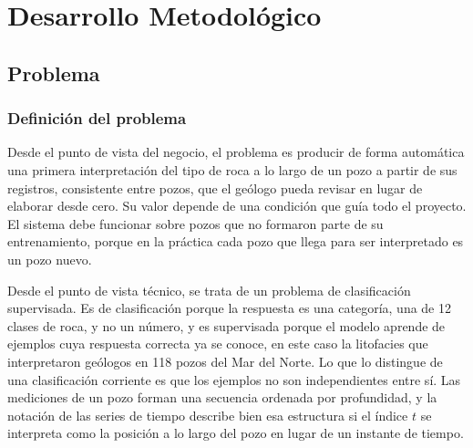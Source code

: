 \documentclass[11pt,a4paper]{article}
\begin{document}
\section{Desarrollo Metodológico}

\subsection{Problema}

\subsubsection{Definición del problema}
\label{sec:definicion-problema}

Desde el punto de vista del negocio, el problema es producir de forma automática una primera interpretación del tipo de roca a lo largo de un pozo a partir de sus registros, consistente entre pozos, que el geólogo pueda revisar en lugar de elaborar desde cero. Su valor depende de una condición que guía todo el proyecto. El sistema debe funcionar sobre pozos que no formaron parte de su entrenamiento, porque en la práctica cada pozo que llega para ser interpretado es un pozo nuevo.

Desde el punto de vista técnico, se trata de un problema de clasificación supervisada. Es de clasificación porque la respuesta es una categoría, una de 12 clases de roca, y no un número, y es supervisada porque el modelo aprende de ejemplos cuya respuesta correcta ya se conoce, en este caso la litofacies que interpretaron geólogos en 118 pozos del Mar del Norte. Lo que lo distingue de una clasificación corriente es que los ejemplos no son independientes entre sí. Las mediciones de un pozo forman una secuencia ordenada por profundidad, y la notación de las series de tiempo describe bien esa estructura si el índice $t$ se interpreta como la posición a lo largo del pozo en lugar de un instante de tiempo.
\end{document}
